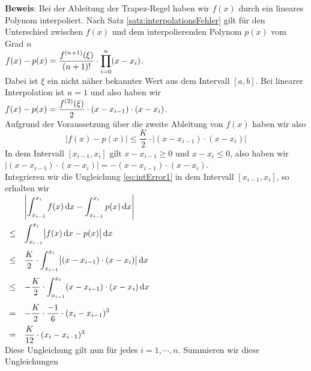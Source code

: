 \noindent
\textbf{Beweis}: Bei der Ableitung der Trapez-Regel haben wir $f(x)$ durch ein lineares
Polynom interpoliert.  Nach Satz \ref{satz:interpolationsFehler} gilt f\"ur den Unterschied
zwischen $f(x)$ und dem interpolierenden Polynom $p(x)$ vom Grad $n$
\\[0.2cm]
\hspace*{1.3cm}
  $\displaystyle f(x) - p(x) = \frac{f^{(n+1)}(\xi)}{(n+1)!} \cdot  \prod\limits_{i=0}^{n}(x-x_i)$.
\\[0.2cm]
Dabei ist $\xi$ ein nicht n\"aher bekannter Wert aus dem Intervall $[a,b]$.
Bei linearer Interpolation ist $n=1$ und also haben wir
\\[0.2cm]
\hspace*{1.3cm}
  $\displaystyle f(x) - p(x) = \frac{f^{(2)}(\xi)}{2} \cdot  (x-x_{i-1})\cdot (x-x_i)$.
\\[0.2cm]
Aufgrund der Voraussetzung \"uber die zweite Ableitung von $f(x)$ haben wir also
\begin{equation}
  \label{eq:intError1}
  |f(x) - p(x)| \leq \frac{K}{2} \cdot  |(x-x_{i-1})\cdot (x-x_i)|  
\end{equation}
In dem Intervall $[x_{i-1},x_i]$ gilt $x-x_{i-1} \geq 0$ und $x-x_i \leq 0$,
also haben wir
\\[0.2cm]
\hspace*{1.3cm}
 $|(x-x_{i-1})\cdot (x-x_i)| = -(x-x_{i-1})\cdot (x-x_i)$.
\\[0.2cm]
Integrieren wir die Ungleichung \ref{eq:intError1} in dem Intervall $[x_{i-1},x_i]$, so
erhalten wir 
\\[0.3cm]
\hspace*{1.3cm}
$
\begin{array}[t]{cl}
      & \displaystyle  \left|\int_{x_{i-1}}^{x_i} f(x)\,\textrm{d} x - \int_{x_{i-1}}^{x_i}p(x)\,\textrm{d} x\right| \\[0.5cm]
 \leq & \displaystyle  \int_{x_{i-1}}^{x_i} \bigl|f(x)\,\textrm{d} x - p(x)\bigr|\,\textrm{d} x \\[0.5cm]
 \leq & \displaystyle \frac{K}{2} \cdot  \int_{x_{i-1}}^{x_i} \bigl|(x-x_{i-1})\cdot (x-x_i)\bigr|\,\textrm{d} x  \\[0.5cm]
 \leq & \displaystyle -\frac{K}{2} \cdot  \int_{x_{i-1}}^{x_i} (x-x_{i-1})\cdot (x-x_i)\,\textrm{d} x  \\[0.5cm]
 =    & \displaystyle -\frac{K}{2} \cdot  \frac{-1}{6} \cdot  (x_i-x_{i-1})^3\\[0.3cm]
 =    & \displaystyle \frac{K}{12} \cdot  (x_i-x_{i-1})^3
\end{array}
$
\\[0.2cm]
Diese Ungleichung gilt nun f\"ur jedes $i=1,\cdots,n$.  Summieren wir diese Ungleichungen
